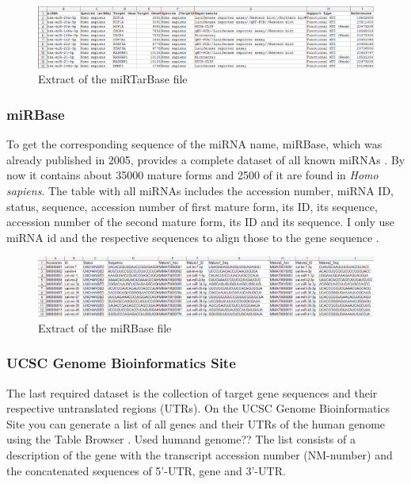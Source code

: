 \documentclass[12pt]{article}
\begin{document}
\begin{figure}[h]
\centering
\includegraphics[width=\textwidth]{results/mirtarbase_scrot.png}
\caption{Extract of the miRTarBase file}
\label{mirtarbase_scrot}
\end{figure}

\vspace{1cm}


\subsubsection{miRBase}
To get the corresponding sequence of the miRNA name, miRBase, which was already published in 2005, provides a complete dataset of all known miRNAs \cite{Griffiths-Jones}. By now it contains about 35000 mature forms and 2500 of it are found in \textit{Homo sapiens}. The table with all miRNAs includes the accession number, miRNA ID, status, sequence, accession number of first mature form, its ID, its sequence, accession number of the second mature form, its ID and its sequence. I only use miRNA id and the respective sequences to align those to the gene sequence \cite{mirbase}.


\begin{figure}[h]
\centering
\includegraphics[width=\textwidth]{results/mirbase.png}
\caption{Extract of the miRBase file}
\label{mirbase_scrot}
\end{figure}


\vspace{1cm}

 
\subsubsection{UCSC Genome Bioinformatics Site}
The last required dataset is the collection of target gene sequences and their respective untranslated regions (UTRs). On the UCSC Genome Bioinformatics Site you can generate a list of all genes and their UTRs of the human genome using the Table Browser \cite{ucsc}. Used humand genome??  The list consists of a description of the gene with the transcript accession number (NM-number) and the concatenated sequences of 5'-UTR, gene and 3'-UTR.\\
\end{document}
